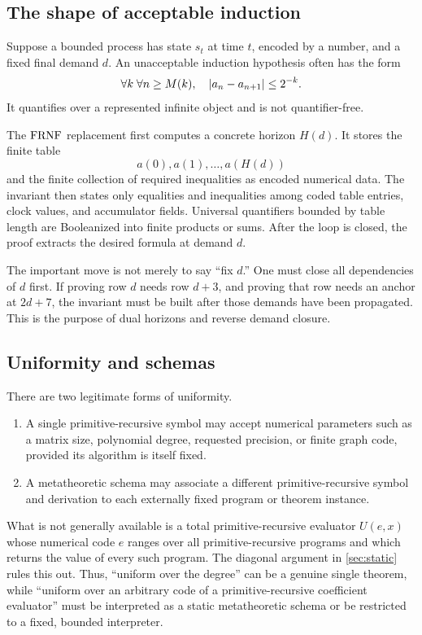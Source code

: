 \subsection{The shape of acceptable induction}

Suppose a bounded process has state \(s_t\) at time \(t\), encoded by a number, and a
fixed final demand \(d\).  An unacceptable induction hypothesis often has the form
\[
  \forall k\;\forall n\ge M(k),\quad \lvert a_n-a_{n+1}\rvert\le 2^{-k}.
\]
It quantifies over a represented infinite object and is not quantifier-free.

The \(\mathrm{FRNF}\) replacement first computes a concrete horizon \(H(d)\).  It stores the
finite table
\[
  a(0),a(1),\ldots,a(H(d))
\]
and the finite collection of required inequalities as encoded numerical data.  The
invariant then states only equalities and inequalities among coded table entries,
clock values, and accumulator fields.  Universal quantifiers bounded by table length
are Booleanized into finite products or sums.  After the loop is closed, the proof
extracts the desired formula at demand \(d\).

The important move is not merely to say ``fix \(d\).''  One must close all dependencies
of \(d\) first.  If proving row \(d\) needs row \(d+3\), and proving that row needs an
anchor at \(2d+7\), the invariant must be built after those demands have been
propagated.  This is the purpose of dual horizons and reverse demand closure.

\subsection{Uniformity and schemas}

There are two legitimate forms of uniformity.

\begin{enumerate}[label=(\alph*)]
\item A single primitive-recursive symbol may accept numerical parameters such as a
matrix size, polynomial degree, requested precision, or finite graph code, provided
its algorithm is itself fixed.
\item A metatheoretic schema may associate a different primitive-recursive symbol and
derivation to each externally fixed program or theorem instance.
\end{enumerate}

What is not generally available is a total primitive-recursive evaluator
\(U(e,x)\) whose numerical code \(e\) ranges over all primitive-recursive programs and
which returns the value of every such program.  The diagonal argument in
\cref{sec:static} rules this out.  Thus, ``uniform over the degree'' can be a genuine
single theorem, while ``uniform over an arbitrary code of a primitive-recursive
coefficient evaluator'' must be interpreted as a static metatheoretic schema or be
restricted to a fixed, bounded interpreter.

